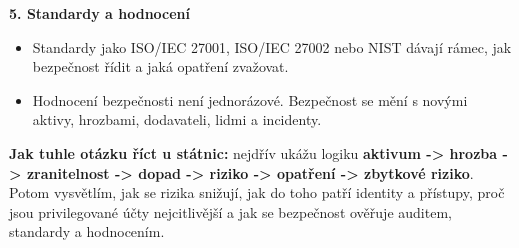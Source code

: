 \documentclass[11pt,a4paper]{article}
\newcommand{\itbox}[1]{\medskip\noindent\colorbox{black!6}{\parbox{\dimexpr\linewidth-2\fboxsep}{#1}}\medskip}
\begin{document}
\textbf{5. Standardy a hodnocení}
\begin{itemize}
  \item Standardy jako ISO/IEC 27001, ISO/IEC 27002 nebo NIST dávají rámec, jak bezpečnost řídit a jaká opatření zvažovat.
  \item Hodnocení bezpečnosti není jednorázové. Bezpečnost se mění s novými aktivy, hrozbami, dodavateli, lidmi a incidenty.
\end{itemize}

\itbox{\textbf{Jak tuhle otázku říct u státnic:} nejdřív ukážu logiku \textbf{aktivum -> hrozba -> zranitelnost -> dopad -> riziko -> opatření -> zbytkové riziko}. Potom vysvětlím, jak se rizika snižují, jak do toho patří identity a přístupy, proč jsou privilegované účty nejcitlivější a jak se bezpečnost ověřuje auditem, standardy a hodnocením.}
\end{document}
